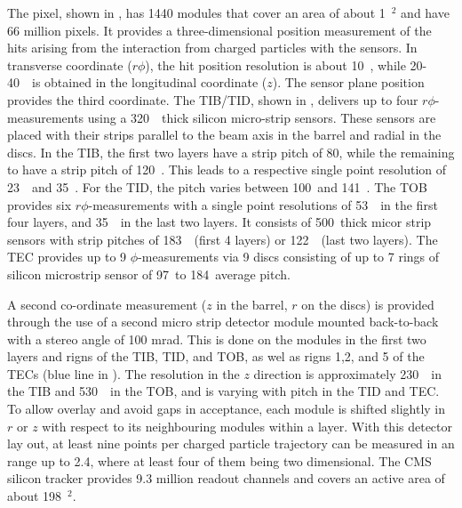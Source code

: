  The pixel, shown in , has 1440 modules that cover an area of about 1~\meter$^2$ and have 66 million pixels. It provides a three-dimensional position measurement of the hits arising from the interaction from charged particles with the sensors. In transverse coordinate ($r\phi$), the hit position resolution is about 10~\micro \meter, while 20-40~\micro \meter\ is obtained in the longitudinal coordinate ($z$). The sensor plane position provides the third coordinate. 
 The TIB/TID, shown in , delivers up to four $r\phi$-measurements using a 320~\micro\meter\ thick silicon micro-strip sensors. These sensors are placed with their strips parallel to the beam axis in the barrel and radial in the discs. In the TIB, the first two layers have a strip pitch of 80\micro \meter, while the remaining to have a strip pitch of 120~\micro\meter. This leads to a respective single point resolution of 23~\micro\meter\ and 35~\micro\meter. For the TID, the pitch varies between 100~\micro\meter and 141~\micro\meter. 
 The TOB provides six $r\phi$-measurements with a single point resolutions of 53~\micro\meter\ in the first four layers, and 35~\micro \meter\ in the last two layers. It consists of 500~\micro\meter thick micor strip sensors with strip pitches of 183~\micro\meter\ (first 4 layers) or 122~\micro\meter\ (last two layers). The TEC provides up to 9 $\phi$-measurements via 9 discs consisting of up to 7 rings of silicon microstrip sensor of 97~\micro\meter to 184~\micro\meter average pitch.
 
 A second co-ordinate measurement ($z$ in the barrel, $r$ on the discs) is provided through the use of a second micro strip detector module mounted back-to-back with a stereo angle of 100 mrad. This is done on the modules in the first two layers and rigns of the TIB, TID, and TOB, as wel as rigns 1,2, and 5 of the TECs (blue line in ). The resolution in the  $z$ direction is approximately 230~\micro \meter\ in the TIB and 530~\micro \meter\ in the TOB, and is varying with pitch in the TID and TEC.  To allow overlay and avoid gaps in acceptance, each module is shifted slightly in $r$ or $z$ with respect to its neighbouring modules within a layer.  With this detector lay out, at least nine points per charged particle trajectory can be measured in an \abspsrap range up to 2.4, where at least four of them being two dimensional.
 The CMS silicon tracker provides 9.3 million readout channels and covers an active area of about 198~\meter$^2$.  
  
  
   
